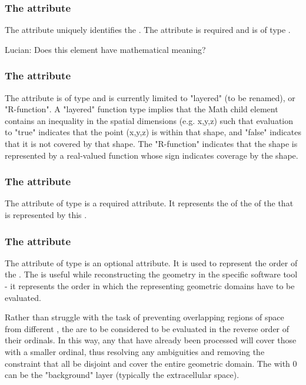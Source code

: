 \subsubsection{The  attribute}
The  attribute uniquely identifies the \AnalyticVolume. The attribute is required and is of type .

{\color{red} Lucian: \notice Does this element have mathematical meaning?}

\subsubsection{The  attribute}
The  attribute is of type  and is currently limited to "layered" (to be renamed), or "R-function".  A "layered" function type implies that the Math child element contains an inequality in the spatial dimensions (e.g. x,y,z) such that evaluation to "true" indicates that the point (x,y,z) is within that shape, and "false" indicates that it is not covered by that shape.  The "R-function"  indicates that the shape is represented by a real-valued function whose sign indicates coverage by the shape.

\subsubsection{The  attribute}
The  attribute of type  is a required attribute. It represents the  of the \DomainType of the \Domain that is represented by this \AnalyticVolume. 

\subsubsection{The  attribute}
The  attribute of type  is an optional attribute. It is used to represent the order of the \AnalyticVolume. The  is useful while reconstructing the geometry in the specific software tool - it represents the order in which the \AnalyticVolumes representing geometric domains have to be evaluated.

Rather than struggle with the task of preventing overlapping regions of space from different \AnalyticVolumes, the \AnalyticVolumes are to be considered to be evaluated in the reverse order of their ordinals.  In this way, any \AnalyticVolumes that have already been processed will cover those with a smaller ordinal, thus resolving any ambiguities and removing the constraint that all \AnalyticVolumes be disjoint and cover the entire geometric domain.  The \AnalyticVolume with  0 can be the "background" layer (typically the extracellular space).  

